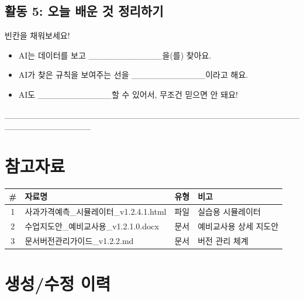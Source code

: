 \documentclass[12pt,a4paper]{article}
\begin{document}
\subsection{ 활동 5: 오늘 배운 것 정리하기}

빈칸을 채워보세요!

\begin{itemize}
    \item AI는 데이터를 보고 \_\_\_\_\_\_\_\_\_\_\_\_을(를) 찾아요.
    \item AI가 찾은 규칙을 보여주는 선을 \_\_\_\_\_\_\_\_\_\_\_\_이라고 해요.
    \item AI도 \_\_\_\_\_\_\_\_\_\_\_\_할 수 있어서, 무조건 믿으면 안 돼요!
\end{itemize}

\begin{tcolorbox}[colback=lightcyan,colframe=cyan,title=\textbf{\texttwemoji{thought balloon} 느낀 점 한 줄}]
\_\_\_\_\_\_\_\_\_\_\_\_\_\_\_\_\_\_\_\_\_\_\_\_\_\_\_\_\_\_\_\_\_\_\_\_\_\_\_\_\_\_\_\_\_\_\_\_\_\_\_\_\_\_\_\_\_\_\_\_\_\_
\end{tcolorbox}

\section{참고자료}

\begin{center}
\begin{tabular}{|c|p{6cm}|c|p{4cm}|}
\hline
\textbf{\#} & \textbf{자료명} & \textbf{유형} & \textbf{비고} \\
\hline
1 & 사과가격예측\_시뮬레이터\_v1.2.4.1.html & 파일 & 실습용 시뮬레이터 \\
\hline
2 & 수업지도안\_예비교사용\_v1.2.1.0.docx & 문서 & 예비교사용 상세 지도안 \\
\hline
3 & 문서버전관리가이드\_v1.2.2.md & 문서 & 버전 관리 체계 \\
\hline
\end{tabular}
\end{center}

\section{생성/수정 이력}
\end{document}
